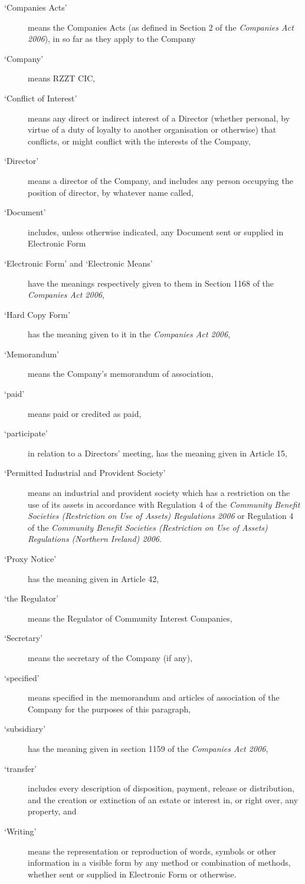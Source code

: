 \documentclass[a4paper,12pt]{article}
\begin{document}
\begin{description}
  \item[`Companies Acts'] means the Companies Acts (as defined in Section 2 of the \textit{Companies Act 2006}), in so far as they apply to the Company
  \item[`Company'] means RZZT CIC,
  \item[`Conflict of Interest'] means any direct or indirect interest of a Director (whether personal, by virtue of a duty of loyalty to another organisation or otherwise) that conflicts, or might conflict with the interests of the Company,
  \item[`Director'] means a director of the Company, and includes any person occupying the position of director, by whatever name called,
  \item[`Document'] includes, unless otherwise indicated, any Document sent or supplied in Electronic Form
  \item[`Electronic Form' and `Electronic Means'] have the meanings respectively given to them in Section 1168 of the \textit{Companies Act 2006},
  \item[`Hard Copy Form'] has the meaning given to it in the \textit{Companies Act 2006},
  \item[`Memorandum'] means the Company’s memorandum of association,
  \item[`paid'] means paid or credited as paid,
  \item[`participate'] in relation to a Directors’ meeting, has the meaning given in Article 15,
  \item[`Permitted Industrial and Provident Society'] means an industrial and provident society which has a restriction on the use of its assets in accordance with Regulation 4 of the \textit{Community Benefit Societies (Restriction on Use of Assets) Regulations 2006} or Regulation 4 of the \textit{Community Benefit Societies (Restriction on Use of Assets) Regulations (Northern Ireland) 2006}.
  \item[`Proxy Notice'] has the meaning given in Article 42,
  \item[`the Regulator'] means the Regulator of Community Interest Companies,
  \item[`Secretary'] means the secretary of the Company (if any),
  \item[`specified'] means specified in the memorandum and articles of association of the Company for the purposes of this paragraph,
  \item[`subsidiary'] has the meaning given in section 1159 of the \textit{Companies Act 2006},
  \item[`transfer'] includes every description of disposition, payment, release or distribution, and the creation or extinction of an estate or interest in, or right over, any property, and
  \item[`Writing'] means the representation or reproduction of words, symbols or other information in a visible form by any method or combination of methods, whether sent or supplied in Electronic Form or otherwise.
\end{description}
\end{document}

